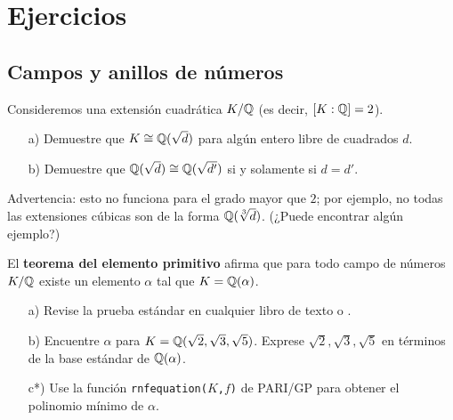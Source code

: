 \pagebreak


\section*{Ejercicios}

\subsection*{Campos y anillos de números}

\begin{ejercicio}
  Consideremos una extensión cuadrática $K/\mathbb{Q}$ (es decir, $[K : \mathbb{Q}] = 2$).

  \begin{enumerate}
  \item[a)] Demuestre que $K \cong \mathbb{Q} (\sqrt{d})$ para algún entero libre de
    cuadrados $d$.

  \item[b)] Demuestre que $\mathbb{Q} (\sqrt{d}) \cong \mathbb{Q} (\sqrt{d'})$ si y solamente
    si $d = d'$.
  \end{enumerate}

  Advertencia: esto no funciona para el grado mayor que $2$; por ejemplo,
  no todas las extensiones cúbicas son de la forma $\mathbb{Q} (\sqrt[3]{d})$.
  (¿Puede encontrar algún ejemplo?)
\end{ejercicio}

\begin{ejercicio}
  El \textbf{teorema del elemento primitivo} afirma que para todo campo
  de números $K/\mathbb{Q}$ existe un elemento $\alpha$ tal que $K = \mathbb{Q} (\alpha)$.

  \begin{enumerate}
  \item[a)] Revise la prueba estándar en cualquier libro de texto
    \cite[Chapter V, Theorem 4.6]{Lang-Algebra} o
    \cite[Chapter I, Theorem 5.6]{Morandi-GTM167}.

  \item[b)] Encuentre $\alpha$ para
    $K = \mathbb{Q} (\sqrt{2}, \sqrt{3}, \sqrt{5})$. Exprese
    $\sqrt{2}, \sqrt{3}, \sqrt{5}$ en términos de la base estándar de
    $\mathbb{Q} (\alpha)$.

  \item[c*)] Use la función \texttt{rnfequation($K$,$f$)} de PARI/GP para
    obtener el polinomio mínimo de $\alpha$.
  \end{enumerate}
\end{ejercicio}

